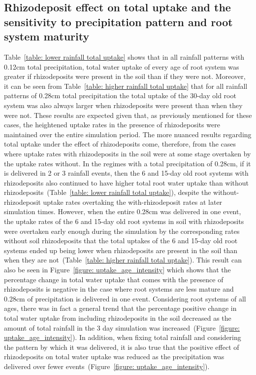 \documentclass[11pt,a4paper]{article}
\numberwithin{equation}{section}
\begin{document}
\subsection{Rhizodeposit effect on total uptake and the sensitivity to precipitation pattern and root system maturity}
Table~\ref{table: lower rainfall total uptake} shows that in all rainfall patterns with 0.12cm total precipitation, total water uptake of every age of root system was greater if rhizodeposits were present in the soil than if they were not. Moreover, it can be seen from Table~\ref{table: higher rainfall total uptake} that for all rainfall patterns of 0.28cm total precipitation the total uptake of the 30-day old root system was also always larger when rhizodeposits were present than when they were not. These results are expected given that, as previously mentioned for these cases, the heightened uptake rates in the presence of rhizodeposits were maintained over the entire simulation period. The more nuanced results regarding total uptake under the effect of rhizodeposits come, therefore, from the cases where uptake rates with rhizodeposits in the soil were at some stage overtaken by the uptake rates without. In the regimes with a total precipitation of 0.28cm, if it is delivered in 2 or 3 rainfall events, then the 6 and 15-day old root systems with rhizodeposits also continued to have higher total root water uptake than without rhizodeposits~(Table~\ref{table: lower rainfall total uptake}), despite the without-rhizodeposit uptake rates overtaking the with-rhizodeposit rates at later simulation times. However, when the entire 0.28cm was delivered in one event, the  uptake rates of the 6 and 15-day old root systems in soil with rhizodeposits were overtaken early enough during the simulation by the corresponding rates without soil rhizodeposits that the total uptakes of the 6 and 15-day old root systems ended up being lower when rhizodeposits are present in the soil than when they are not~(Table~\ref{table: higher rainfall total uptake}). This result can also be seen in Figure~\ref{figure: uptake_age_intensity} which shows that the percentage change in total water uptake that comes with the presence of rhizodeposits is negative in the case where root systems are less mature and 0.28cm of precipitation is delivered in one event. Considering root systems of all ages, there was in fact a general trend that the percentage positive change in total water uptake from including rhizodeposits in the soil decreased as the amount of total rainfall in the 3 day simulation was increased~(Figure~\ref{figure: uptake_age_intensity}). In addition, when fixing total rainfall and considering the pattern by which it was delivered, it is also true that the positive effect of rhizodeposits on total water uptake was reduced as the precipitation was delivered over fewer events~(Figure~\ref{figure: uptake_age_intensity}).
\end{document}
